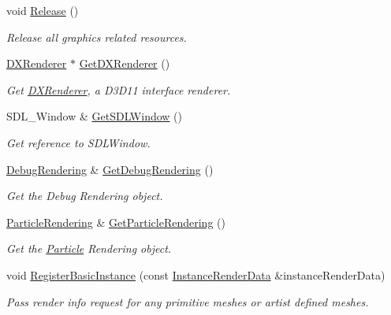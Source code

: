 \begin{DoxyCompactItemize}
\mbox{\label{classAppRenderer_ab0d289c6d6375e274c91f42d3256d584}} 
void \hyperlink{classAppRenderer_ab0d289c6d6375e274c91f42d3256d584}{Release} ()
\begin{DoxyCompactList}\small\item\em Release all graphics related resources. \end{DoxyCompactList}\item 
\hyperlink{classDXRenderer}{D\+X\+Renderer} $\ast$ \hyperlink{classAppRenderer_a22dc8c3e1972281376b321336d6451a3}{Get\+D\+X\+Renderer} ()
\begin{DoxyCompactList}\small\item\em Get \hyperlink{classDXRenderer}{D\+X\+Renderer}, a D3\+D11 interface renderer. \end{DoxyCompactList}\item 
S\+D\+L\+\_\+\+Window \& \hyperlink{classAppRenderer_ae523d428966c527b385a65bae7bdb086}{Get\+S\+D\+L\+Window} ()
\begin{DoxyCompactList}\small\item\em Get reference to S\+D\+L\+Window. \end{DoxyCompactList}\item 
\hyperlink{classDebugRendering}{Debug\+Rendering} \& \hyperlink{classAppRenderer_af4f38db33ff5ff4a321e9c44e9472b41}{Get\+Debug\+Rendering} ()
\begin{DoxyCompactList}\small\item\em Get the Debug Rendering object. \end{DoxyCompactList}\item 
\hyperlink{classParticleRendering}{Particle\+Rendering} \& \hyperlink{classAppRenderer_a0e5afe33f9a99df3c7b546710d20aa45}{Get\+Particle\+Rendering} ()
\begin{DoxyCompactList}\small\item\em Get the \hyperlink{structParticle}{Particle} Rendering object. \end{DoxyCompactList}\item 
void \hyperlink{classAppRenderer_af7ca20884c77f5d17a59835742611803}{Register\+Basic\+Instance} (const \hyperlink{structInstanceRenderData}{Instance\+Render\+Data} \&instance\+Render\+Data)
\begin{DoxyCompactList}\small\item\em Pass render info request for any primitive meshes or artist defined meshes. \end{DoxyCompactList}\item 

\end{DoxyCompactItemize}
